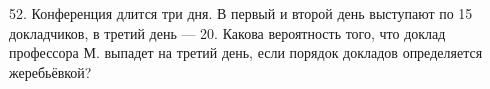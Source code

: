 52. Конференция длится три дня. В первый и второй день выступают по 15 докладчиков, в третий день --- 20. Какова вероятность того, что доклад профессора М. выпадет на третий день, если порядок докладов определяется жеребьёвкой?\\

